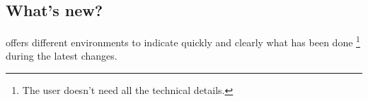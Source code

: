 \documentclass[10pt, a4paper]{article}
\begin{document}
\subsection{What's new?}

 offers different environments to indicate quickly and clearly what has been done
\footnote{
    The user doesn't need all the technical details.
}
during the latest changes.


\begin{tdocexa}
    \leavevmode

\end{tdocexa}




\begin{tdocexa}
    \leavevmode

\end{tdocexa}




\begin{tdocexa}
    \leavevmode

\end{tdocexa}




\begin{tdocexa}
    \leavevmode

\end{tdocexa}
\end{document}
